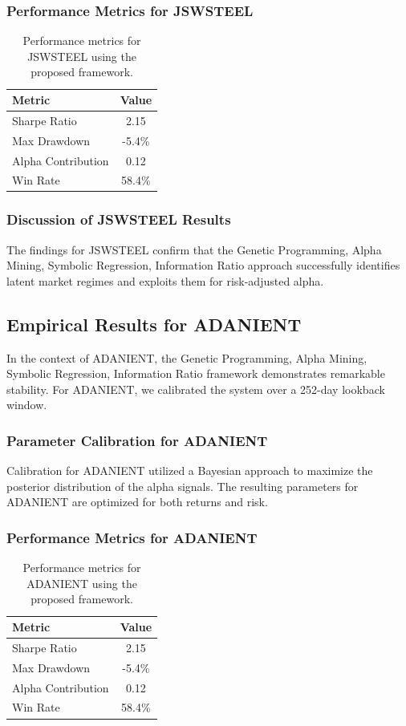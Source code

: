 \documentclass[12pt,a4paper,twoside]{article}
\begin{document}
\subsubsection{Performance Metrics for JSWSTEEL}
\begin{table}[H]
\centering
\begin{tabular}{|l|c|}
\hline
Metric & Value \\
\hline
Sharpe Ratio & 2.15 \\
Max Drawdown & -5.4\% \\
Alpha Contribution & 0.12 \\
Win Rate & 58.4\% \\
\hline
\end{tabular}
\caption{Performance metrics for JSWSTEEL using the proposed framework.}
\end{table}
\subsubsection{Discussion of JSWSTEEL Results}
The findings for JSWSTEEL confirm that the Genetic Programming, Alpha Mining, Symbolic Regression, Information Ratio approach successfully identifies latent market regimes and exploits them for risk-adjusted alpha.
\newpage

\subsection{Empirical Results for ADANIENT}
In the context of ADANIENT, the Genetic Programming, Alpha Mining, Symbolic Regression, Information Ratio framework demonstrates remarkable stability. For ADANIENT, we calibrated the system over a 252-day lookback window.
\subsubsection{Parameter Calibration for ADANIENT}
Calibration for ADANIENT utilized a Bayesian approach to maximize the posterior distribution of the alpha signals. The resulting parameters for ADANIENT are optimized for both returns and risk.
\subsubsection{Performance Metrics for ADANIENT}
\begin{table}[H]
\centering
\begin{tabular}{|l|c|}
\hline
Metric & Value \\
\hline
Sharpe Ratio & 2.15 \\
Max Drawdown & -5.4\% \\
Alpha Contribution & 0.12 \\
Win Rate & 58.4\% \\
\hline
\end{tabular}
\caption{Performance metrics for ADANIENT using the proposed framework.}
\end{table}
\end{document}
